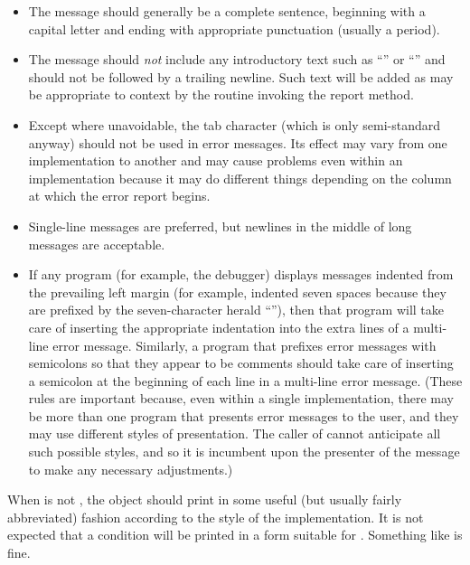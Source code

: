 \begin{itemize}
 \item
    The message should generally be a complete sentence, beginning with a
   capital letter and ending with appropriate punctuation (usually a period).

 \item
    The message should \emph{not} include any introductory text such as ``''
   or ``'' and should not be followed by a trailing newline. Such
   text will be added as may be appropriate to context by the routine invoking
   the report method.

 \item
    Except where unavoidable, the tab character (which is only semi-standard anyway)
    should not be used in
   error messages. Its effect may vary from one implementation to another and may
   cause problems even within an implementation because it may do different
   things depending on the column at which the error report begins.

 \item
    Single-line messages are preferred, but newlines in the middle of long
   messages are acceptable.

 \item
   If any program (for example, the debugger) displays messages indented from the
   prevailing left margin (for example, indented seven spaces because they
   are prefixed by the seven-character herald ``''), then that program
   will take care of inserting the appropriate indentation into the extra
   lines of a multi-line error message. Similarly, a program that prefixes
   error messages with semicolons so that they appear to be comments should
   take care of inserting a semicolon at the beginning of each line in a
   multi-line error message. (These rules are important because, even within
   a single implementation, there may be more than one program that presents
   error messages to the user, and they may use different styles of
   presentation. The caller of  cannot anticipate all such possible
   styles, and so it is incumbent upon the presenter of the message to make
   any necessary adjustments.)
\end{itemize}

When  is not , the object should print in some useful (but
usually fairly abbreviated) fashion according to the style of the
implementation. It is not expected that a condition will be printed in a form
suitable for . Something like 
is fine.

